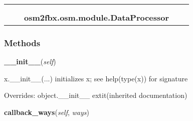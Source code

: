     \label{osm2fbx:osm:module:DataProcessor}
\begin{tabular}{cccccc}
\multicolumn{2}{r}{\settowidth{\BCL}{object}\multirow{2}{\BCL}{object}}
&&
  \\\cline{3-3}
  &&\multicolumn{1}{c|}{}
&&
  \\
&&\multicolumn{2}{l}{\textbf{osm2fbx.osm.module.DataProcessor}}
\end{tabular}



  \subsubsection{Methods}

    \vspace{0.5ex}

\hspace{.8\funcindent}\begin{boxedminipage}{\funcwidth}

    \raggedright \textbf{\_\_init\_\_}(\textit{self})

\setlength{\parskip}{2ex}
    x.\_\_init\_\_(...) initializes x; see help(type(x)) for signature

\setlength{\parskip}{1ex}
      Overrides: object.\_\_init\_\_ 	extit{(inherited documentation)}

    \end{boxedminipage}

    \label{osm2fbx:osm:module:DataProcessor:callback_ways}

    \vspace{0.5ex}

\hspace{.8\funcindent}\begin{boxedminipage}{\funcwidth}

    \raggedright \textbf{callback\_ways}(\textit{self}, \textit{ways})

\setlength{\parskip}{2ex}
\setlength{\parskip}{1ex}
    \end{boxedminipage}

